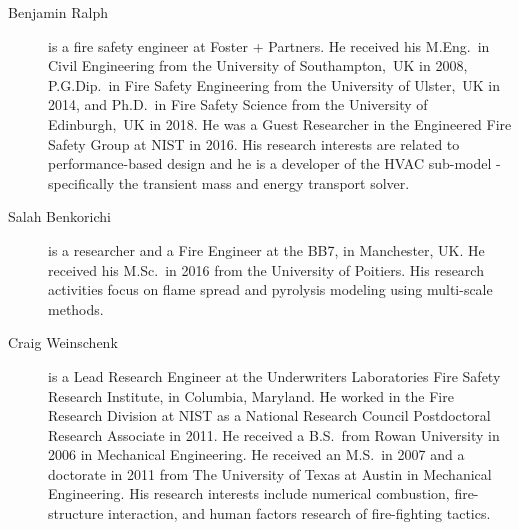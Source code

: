 \begin{description}
\item[Benjamin Ralph] is a fire safety engineer at Foster + Partners. He received his M.Eng.~in Civil Engineering from the University of Southampton,~UK in 2008, P.G.Dip.~in Fire Safety Engineering from the University of Ulster,~UK in 2014, and Ph.D.~in Fire Safety Science from the University of Edinburgh,~UK in 2018. He was a Guest Researcher in the Engineered Fire Safety Group at NIST in 2016. His research interests are related to performance-based design and he is a developer of the HVAC sub-model - specifically the transient mass and energy transport solver.

\item[Salah Benkorichi] is a researcher and a Fire Engineer at the BB7, in Manchester, UK. He received his M.Sc.~in 2016 from the University of Poitiers. His research activities focus on flame spread and pyrolysis modeling using multi-scale methods.

\item[Craig Weinschenk] is a Lead Research Engineer at the Underwriters Laboratories Fire Safety Research Institute, in Columbia, Maryland. He worked in the Fire Research Division at NIST as a National Research Council Postdoctoral Research Associate in 2011. He received a B.S.~from Rowan University in 2006 in Mechanical Engineering. He received an M.S.~in 2007 and a doctorate in 2011 from The University of Texas at Austin in Mechanical Engineering. His research interests include numerical combustion, fire-structure interaction, and human factors research of fire-fighting tactics.

\end{description}


